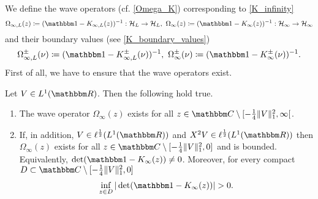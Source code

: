 We define the wave operators (cf. \eqref{Omega_K}) corresponding to \eqref{K_infinity}
\begin{equation}\label{Omega}
  \Omega_{\infty,L}(z)  \coloneqq (\id -K_{\infty,L}(z))^{-1} : \hilbert_L\to\hilbert_L,\
  \Omega_\infty(z)     \coloneqq (\id -K_\infty(z))^{-1} : \hilbert_\infty\to\hilbert_\infty
\end{equation}
and their boundary values (see \eqref{K_boundary_values})
\begin{equation}\label{Omega_boundary_values}
  \Omega_{\infty,L}^\pm(\nu)  \coloneqq (\id -K_{\infty,L}^\pm(\nu))^{-1},\
  \Omega_\infty^\pm(\nu) \coloneqq (\id -K_\infty^\pm(\nu))^{-1} .
\end{equation}
First of all, we have to ensure that the wave operators exist.

\begin{lemma}\label{wo01t}
Let $V\in L^1(\R)$. Then the following hold true.
\begin{enumerate}
\item 
The wave operator $\Omega_\infty(z)$ exists for all $z\in\C\setminus\interval[open right]{-\frac{1}{4}\|V\|_1^2}{\infty}$.
\item
If, in addition, $V\in\ell^{\frac{1}{2}}(L^1(\R))$ and $X^2V\in\ell^{\frac{1}{2}}(L^1(\R))$ then
$\Omega_\infty(z)$ exists for all $z\in\C\setminus[-\frac{1}{4}\|V\|_1^2, 0]$ and is bounded.
Equivalently, $\det(\id-K_\infty(z))\neq 0$. Moreover, for every compact $D\subset\C\setminus[-\frac{1}{4}\|V\|_1^2, 0]$
\begin{equation}\label{wo01t01}
  \inf_{z\in D} |\det(\id-K_\infty(z))| > 0 .
\end{equation}
\end{enumerate}
\end{lemma}
